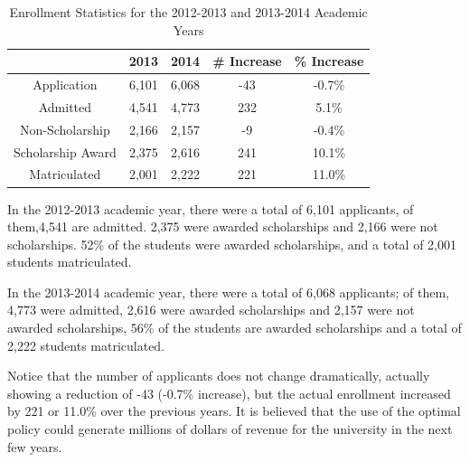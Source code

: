 \documentclass[12pt,english]{report}
\begin{document}
\begin{table}[ht!]
\centering
\begin{tabular}{|c|c|c|c|c|}
\hline
& 2013 & 2014 & \# Increase & \% Increase \\ \hline
Application                    & 6,101 & 6,068 & -43         & -0.7\%      \\
\hline
Admitted                       & 4,541 & 4,773 & 232         & 5.1\%       \\
\hline
Non-Scholarship                & 2,166 & 2,157 & -9          & -0.4\%      \\
\hline
Scholarship Award              & 2,375 & 2,616 & 241         & 10.1\%      \\
\hline
Matriculated                   & 2,001 & 2,222 & 221         & 11.0\%      \\
\hline
\end{tabular}
\caption{Enrollment Statistics for the 2012-2013 and 2013-2014 Academic Years}
\label{enroll_stats}

\end{table}

In the 2012-2013 academic year, there were a total of 6,101 applicants, of
them,4,541   are admitted. 2,375 were awarded scholarships and 2,166 were not
scholarships. 52\% of the students were awarded scholarships, and a total of
2,001 students matriculated.

In the 2013-2014 academic year, there were a total of 6,068 applicants; of
them, 4,773 were admitted, 2,616 were awarded scholarships and 2,157 were not
awarded scholarships, 56\% of the students are awarded scholarships and a total
of 2,222 students matriculated.

Notice that the number of applicants does not change dramatically, actually
showing a reduction of -43 (-0.7\% increase), but the actual enrollment
increased by 221  or 11.0\% over the previous years.  It is believed that the
use of the optimal policy could generate millions of dollars of revenue for the
university in the next few years.
\end{document}

